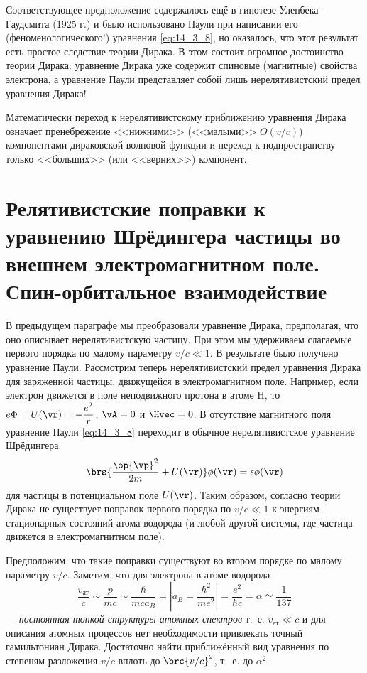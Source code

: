 Соответствующее предположение содержалось ещё в гипотезе Уленбека-Гаудсмита (1925 г.) и было использовано Паули при написании его (феноменологического!) уравнения \eqref{eq:14_3_8}, но оказалось, что этот результат есть простое следствие теории Дирака. В этом состоит огромное достоинство теории Дирака: уравнение Дирака уже содержит спиновые (магнитные) свойства электрона, а уравнение Паули представляет собой лишь нерелятивистский предел уравнения Дирака!

Математически переход к нерелятивистскому приближению уравнения Дирака означает пренебрежение <<нижними>> (<<малыми>> $O(v/c)$) компонентами дираковской волновой функции и переход к подпространству только <<больших>> (или <<верних>>) компонент.

\section{Релятивистские поправки к уравнению Шрёдингера частицы во внешнем электромагнитном поле. Спин-орбитальное взаимодействие}

В предыдущем параграфе мы преобразовали уравнение Дирака, предполагая, что оно описывает нерелятивистскую частицу. При этом мы удерживаем слагаемые первого порядка по малому параметру $v/c \ll 1$. В результате было получено уравнение Паули. Рассмотрим теперь нерелятивистский предел уравнения Дирака для заряженной частицы, движущейся в электромагнитном поле. Например, если электрон движется в поле неподвижного протона в атоме H, то $e\Phi = U(\vr) = -\dfrac{e^2}{r}$, $\vA = 0$ и $\Hvec = 0$. В отсутствие магнитного поля уравнение Паули \eqref{eq:14_3_8} переходит в обычное нерелятивистское уравнение Шрёдингера.
$$
\brs{\frac{\op{\vp}^2}{2m} + U(\vr)}\phi(\vr)=\epsilon \phi(\vr)
$$
для частицы в потенциальном поле $U(\vr)$. Таким образом, согласно теории Дирака не существует поправок первого порядка по $v/c \ll 1$ к энергиям стационарных состояний атома водорода (и любой другой системы, где частица движется в электромагнитном поле).

Предположим, что такие поправки существуют во втором порядке по малому параметру $v/c$. Заметим, что для электрона в атоме водорода
$$
\frac{v_{\text{ат}}}{c} \sim \frac{p}{mc} \sim \frac{\hbar}{m c a_B} = \left | a_B = \frac{\hbar^2}{m e^2}\right | = \frac{e^2}{\hbar c} = \alpha \simeq \frac{1}{137}
$$
--- {\em постоянная тонкой структуры атомных спектров} т.~е. $v_{\text{ат}} \ll c$ и для описания атомных процессов нет необходимости привлекать точный гамильтониан Дирака. Достаточно найти приближённый вид уравнения по степеням разложения $v/c$ вплоть до $\brc{v/c}^2$, т.~е. до $\alpha^2$.

